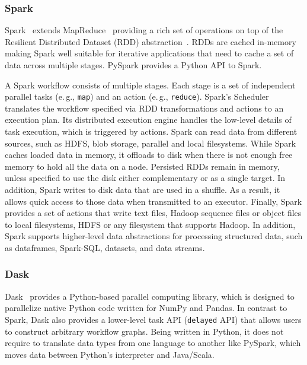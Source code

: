 
\subsubsection*{Spark}
Spark~\cite{zaharia2010spark} extends MapReduce~\cite{dean2004mapreduce} providing a rich set of operations on top of the Resilient Distributed Dataset (RDD) abstraction~\cite{zaharia2012resilient}.
RDDs are cached in-memory making Spark well suitable for iterative applications that need to cache a set of data across multiple stages.
PySpark provides a Python API to Spark.

A Spark workflow consists of multiple stages.
Each stage is a set of independent parallel tasks (e.\,g., \texttt{map}) and an action (e.\,g., \texttt{reduce}).
Spark's Scheduler translates the workflow specified via RDD transformations and actions to an execution plan.
Its distributed execution engine handles the low-level details of task execution, which is triggered by actions.
Spark can read data from different sources, such as HDFS, blob storage, parallel and local filesystems.
While Spark caches loaded data in memory, it offloads to disk when there is not enough free memory to hold all the data on a node.
Persisted RDDs remain in memory, unless specified to use the disk either complementary or as a single target.
In addition, Spark writes to disk data that are used in a shuffle.
As a result, it allows quick access to those data when transmitted to an executor.
Finally, Spark provides a set of actions that write text files, Hadoop sequence files or object files to local filesystems, HDFS or any filesystem that supports Hadoop.
In addition, Spark supports higher-level data abstractions for processing structured data, such as dataframes, Spark-SQL, datasets, and data streams.

\subsubsection*{Dask}
Dask~\cite{rocklin2015dask} provides a Python-based parallel computing library, which is designed to parallelize native Python code written for NumPy and Pandas.
In contrast to Spark, Dask also provides a lower-level task API (\texttt{delayed} API) that allows users to construct arbitrary workflow graphs.
Being written in Python, it does not require to translate data types from one language to another like PySpark, which moves data between Python's interpreter and Java/Scala.

